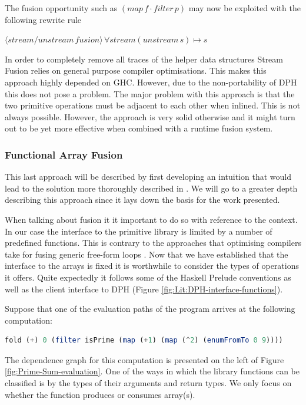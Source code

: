 \documentclass[preamble.tex]{subfiles}
\begin{document}
The fusion opportunity such as $(map\, f\cdot filter\, p)$ may now be exploited with the following rewrite rule

$\langle stream/unstream\, fusion\rangle\,\forall stream(unstream\, s)\mapsto s$

In order to completely remove all traces of the helper data structures Stream Fusion relies on general purpose compiler optimisations. This makes this approach highly depended on GHC. However, due to the non-portability of DPH this does not pose a problem. The major problem with this approach is that the two primitive operations must be adjacent to each other when inlined. This is not always possible. However, the approach is very solid otherwise and it might turn out to be yet more effective when combined with a runtime fusion system.


\subsubsection{Functional Array Fusion}

This last approach will be described by first developing an intuition that would lead to the solution more thoroughly described in \cite{CK01,CK03}. We will go to a greater depth describing this approach since it lays down the basis for the work presented.

When talking about fusion it it important to do so with reference to the context. In our case the interface to the primitive library is limited by a number of predefined functions. This is contrary to the approaches that optimising compilers take for fusing generic free-form loops \cite{KA02}. Now that we have established that the interface to the arrays is fixed it is worthwhile to consider the types of operations it offers. Quite expectedly it follows some of the Haskell Prelude conventions as well as the client interface to DPH (Figure \vref{fig:Lit:DPH-interface-functions}).

Suppose that one of the evaluation paths of the program arrives at the following computation:

\begin{lstlisting}[basicstyle={\ttfamily},language=Haskell]
fold (+) 0 (filter isPrime (map (+1) (map (^2) (enumFromTo 0 9))))
\end{lstlisting}


The dependence graph \cite{RMKB06,KA02} for this computation is presented on the left of Figure \vref{fig:Prime-Sum-evaluation}. One of the ways in which the library functions can be classified is by the types of their arguments and return types. We only focus on whether the function produces or consumes array(s).
\end{document}
